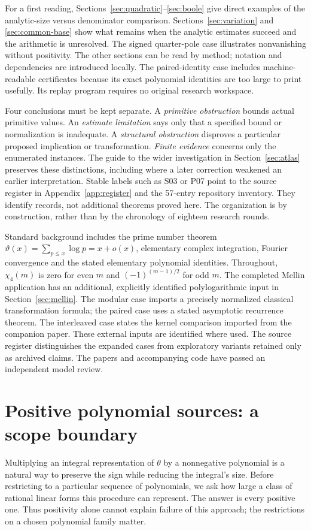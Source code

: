 For a first reading, Sections~\ref{sec:quadratic}--\ref{sec:boole}
give direct examples of the analytic-size versus denominator comparison.
Sections~\ref{sec:variation} and \ref{sec:common-base} show what remains
when the analytic estimates succeed and the arithmetic is unresolved.
The signed quarter-pole case illustrates nonvanishing without positivity.
The other sections can be read by method; notation and dependencies are
introduced locally. The paired-identity case includes machine-readable
certificates because its exact polynomial identities are too large to
print usefully. Its replay program requires no original research workspace.

Four conclusions must be kept separate. A \emph{primitive obstruction}
bounds actual primitive values. An \emph{estimate limitation} says only
that a specified bound or normalization is inadequate. A \emph{structural
obstruction} disproves a particular proposed implication or transformation.
\emph{Finite evidence} concerns only the enumerated instances. The guide
to the wider investigation in Section~\ref{sec:atlas} preserves these
distinctions, including where a later correction weakened an earlier
interpretation. Stable labels such as S03 or P07 point to the source
register in Appendix~\ref{app:register} and the 57-entry repository
inventory. They identify records, not additional theorems proved here.
The organization is by construction, rather than by the chronology of
eighteen research rounds.

Standard background includes the prime number theorem
$\vartheta(x)=\sum_{p\leq x}\log p=x+o(x)$, elementary complex integration,
Fourier convergence and the stated elementary polynomial identities.
Throughout, $\chi_4(m)$ is zero for even $m$ and
$(-1)^{(m-1)/2}$ for odd $m$.
The completed Mellin application has an additional, explicitly identified
polylogarithmic input in Section~\ref{sec:mellin}. The modular case imports a precisely normalized classical transformation
formula; the paired case uses a stated asymptotic recurrence theorem.
The interleaved case states the kernel comparison imported from the
companion paper. These external inputs are identified where used.
The source register distinguishes the expanded cases from exploratory
variants retained only as archived claims. The papers and accompanying code
have passed an independent model review.

\section{Positive polynomial sources: a scope boundary}\label{sec:cone}
Multiplying an integral representation of $\theta$ by a nonnegative
polynomial is a natural way to preserve the sign while reducing the
integral's size. Before restricting to a particular sequence of
polynomials, we ask how large a class of rational linear forms this
procedure can represent. The answer is every positive one. Thus
positivity alone cannot explain failure of this approach; the
restrictions on a chosen polynomial family matter.


